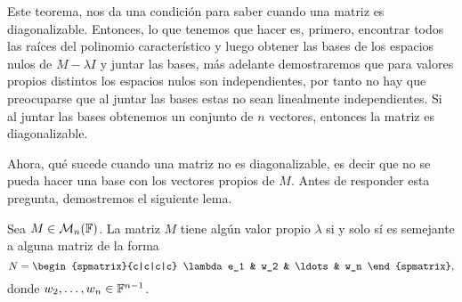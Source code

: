 Este teorema, nos da una condición para saber cuando una matriz es diagonalizable. Entonces, lo que tenemos que hacer es, primero, encontrar todos las raíces del polinomio característico y luego obtener las bases de los espacios nulos de $M - \lambda I$ y juntar las bases, más adelante demostraremos que para valores propios distintos los espacios nulos son independientes, por tanto no hay que preocuparse que al juntar las bases estas no sean linealmente independientes. Si al juntar las bases obtenemos un conjunto de $n$ vectores, entonces la matriz es diagonalizable.

Ahora, qué sucede cuando una matriz no es diagonalizable, es decir que no se pueda hacer una base con los vectores  propios de $M$. Antes de responder esta pregunta, demostremos el siguiente lema.

\begin{lema}\label{lema:CleanColumn1}
  Sea $M \in \mathcal{M}_n(\mathbb{F})$. La matriz $M$ tiene algún valor propio $\lambda$ si y solo sí es semejante a alguna matriz de la forma
  \[
    N = \begin{spmatrix}{c|c|c|c}
      \lambda e_1 & w_2 &  \ldots & w_n
    \end{spmatrix},
  \]
  donde $w_2, \ldots, w_n \in \mathbb{F}^{n-1}$.
\end{lema}
